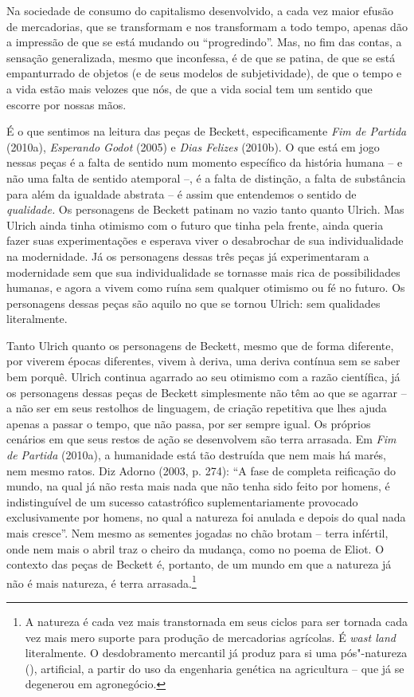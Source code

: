 {Na sociedade de consumo do capitalismo desenvolvido, a cada vez maior
efusão de mercadorias, que se transformam e nos transformam a todo
tempo, apenas dão a impressão de que se está mudando ou ``progredindo''.
Mas, no fim das contas, a sensação generalizada, mesmo que inconfessa, é
de que se patina, de que se está empanturrado de objetos (e de seus
modelos de subjetividade), de que o tempo e a vida estão mais velozes
que nós, de que a vida social tem um sentido que escorre por nossas
mãos.

É o que sentimos na leitura das peças de Beckett, especificamente
\emph{Fim de Partida} (2010a), \emph{Esperando Godot} (2005) e
\emph{Dias Felizes} (2010b). O que está em jogo nessas peças é a falta
de sentido num momento específico da história humana -- e não uma falta
de sentido atemporal --, é a falta de distinção, a falta de substância
para além da igualdade abstrata -- é assim que entendemos o sentido de
\emph{qualidade.} Os personagens de Beckett patinam no vazio tanto
quanto Ulrich. Mas Ulrich ainda tinha otimismo com o futuro que tinha
pela frente, ainda queria fazer suas experimentações e esperava viver o
desabrochar de sua individualidade na modernidade. Já os personagens
dessas três peças já experimentaram a modernidade sem que sua
individualidade se tornasse mais rica de possibilidades humanas, e agora
a vivem como ruína sem qualquer otimismo ou fé no futuro. Os personagens
dessas peças são aquilo no que se tornou Ulrich: sem qualidades
literalmente.

Tanto Ulrich quanto os personagens de Beckett, mesmo que de forma
diferente, por viverem épocas diferentes, vivem à deriva, uma deriva
contínua sem se saber bem porquê. Ulrich continua agarrado ao seu
otimismo com a razão científica, já os personagens dessas peças de
Beckett simplesmente não têm ao que se agarrar -- a não ser em seus
restolhos de linguagem, de criação repetitiva que lhes ajuda apenas a
passar o tempo, que não passa, por ser sempre igual. Os próprios
cenários em que seus restos de ação se desenvolvem são terra arrasada.
Em \emph{Fim de Partida} (2010a), a humanidade está tão destruída
que nem mais há marés, nem mesmo ratos. Diz Adorno (2003, p. 274): ``A
fase de completa reificação do mundo, na qual já não resta mais nada que
não tenha sido feito por homens, é indistinguível de um sucesso
catastrófico suplementariamente provocado exclusivamente por homens, no
qual a natureza foi anulada e depois do qual nada mais cresce''. Nem
mesmo as sementes jogadas no chão brotam -- terra infértil, onde nem
mais o abril traz o cheiro da mudança, como no poema de Eliot. O
contexto das peças de Beckett é, portanto, de um mundo em que a natureza
já não é mais natureza, é terra arrasada.\footnote{A natureza é cada vez
  mais transtornada em seus ciclos para ser tornada cada vez mais mero
  suporte para produção de mercadorias agrícolas. É \emph{wast land}
  literalmente. O desdobramento mercantil já produz para si uma
  pós"-natureza (), artificial, a partir do uso da engenharia
  genética na agricultura -- que já se degenerou em agronegócio.}

}
